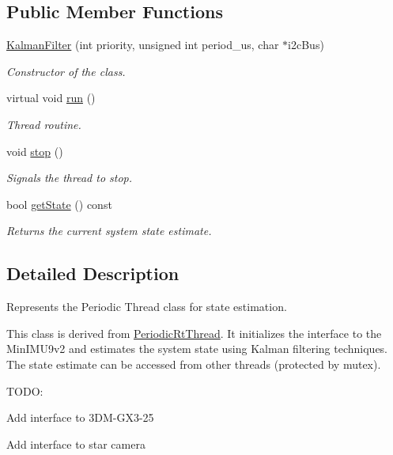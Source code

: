 \subsection*{\-Public \-Member \-Functions}
\begin{DoxyCompactItemize}
\item 
\hyperlink{class_u_s_u_1_1_kalman_filter_acbde9bd0fafa0e6c1aa078d392b28a6d}{\-Kalman\-Filter} (int priority, unsigned int period\-\_\-us, char $\ast$i2c\-Bus)
\begin{DoxyCompactList}\small\item\em \-Constructor of the class. \end{DoxyCompactList}\item 
virtual void \hyperlink{class_u_s_u_1_1_kalman_filter_a47cc7f620b57b25133289e61dbf2a7be}{run} ()
\begin{DoxyCompactList}\small\item\em \-Thread routine. \end{DoxyCompactList}\item 
void \hyperlink{class_u_s_u_1_1_kalman_filter_a3f8b3ce719dcb24745150f8c4ef361b8}{stop} ()
\begin{DoxyCompactList}\small\item\em \-Signals the thread to stop. \end{DoxyCompactList}\item 
bool \hyperlink{class_u_s_u_1_1_kalman_filter_ab1259296dd62ed5958f9b3dd88622f73}{get\-State} () const 
\begin{DoxyCompactList}\small\item\em \-Returns the current system state estimate. \end{DoxyCompactList}\end{DoxyCompactItemize}


\subsection{\-Detailed \-Description}
\-Represents the \-Periodic \-Thread class for state estimation. 

\-This class is derived from \hyperlink{class_u_s_u_1_1_periodic_rt_thread}{\-Periodic\-Rt\-Thread}. \-It initializes the interface to the \-Min\-I\-M\-U9v2 and estimates the system state using \-Kalman filtering techniques. \-The state estimate can be accessed from other threads (protected by mutex).

\-T\-O\-D\-O\-:
\begin{DoxyItemize}
\item \-Add interface to 3\-D\-M-\/\-G\-X3-\/25
\item \-Add interface to star camera 
\end{DoxyItemize}

